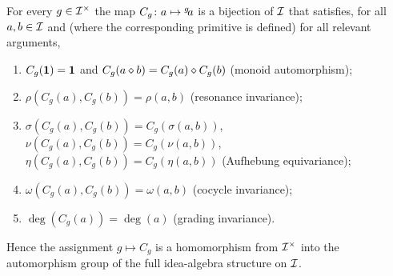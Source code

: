\begin{theorem}\label{thm:conjugation}
For every $g\in\mathcal{I}^{\times}$ the map $C_g\colon a\mapsto
{}^{g}\!a$ is a bijection of $\mathcal{I}$ that satisfies, for all
$a,b\in\mathcal{I}$ and (where the corresponding primitive is defined) for
all relevant arguments,
\begin{enumerate}
  \item $C_g(\mathbf{1}) = \mathbf{1}$ and $C_g(a\mathbin{\diamond} b) = C_g(a)\mathbin{\diamond} C_g(b)$
        (monoid automorphism);
  \item $\rho(C_g(a),C_g(b)) = \rho(a,b)$ (resonance invariance);
  \item $\sigma(C_g(a),C_g(b)) = C_g(\sigma(a,b))$,
        $\nu(C_g(a),C_g(b)) = C_g(\nu(a,b))$,
        $\eta(C_g(a),C_g(b)) = C_g(\eta(a,b))$ (Aufhebung equivariance);
  \item $\omega(C_g(a),C_g(b)) = \omega(a,b)$ (cocycle invariance);
  \item $\deg(C_g(a)) = \deg(a)$ (grading invariance).
\end{enumerate}
Hence the assignment $g\mapsto C_g$ is a homomorphism from
$\mathcal{I}^{\times}$ into the automorphism group of the full
idea-algebra structure on $\mathcal{I}$.
\end{theorem}

